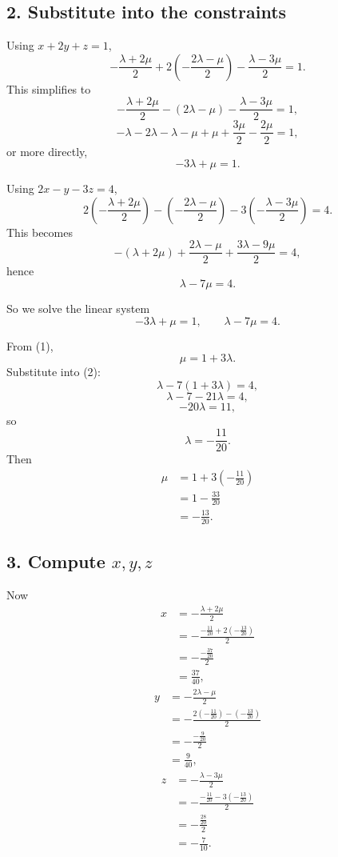 \subsection*{2. Substitute into the constraints}

Using \(x+2y+z=1\),
\[
-\frac{\lambda+2\mu}{2}
+2\left(-\frac{2\lambda-\mu}{2}\right)
-\frac{\lambda-3\mu}{2}
=1.
\]
This simplifies to
\[
-\frac{\lambda+2\mu}{2}-(2\lambda-\mu)-\frac{\lambda-3\mu}{2}=1,
\]
\[
-\lambda-2\lambda-\lambda-\mu+\mu+\frac{3\mu}{2}-\frac{2\mu}{2}=1,
\]
or more directly,
\[
-3\lambda+\mu=1. \tag{1}
\]

Using \(2x-y-3z=4\),
\[
2\left(-\frac{\lambda+2\mu}{2}\right)
-\left(-\frac{2\lambda-\mu}{2}\right)
-3\left(-\frac{\lambda-3\mu}{2}\right)
=4.
\]
This becomes
\[
-(\lambda+2\mu)+\frac{2\lambda-\mu}{2}+\frac{3\lambda-9\mu}{2}=4,
\]
hence
\[
\lambda-7\mu=4. \tag{2}
\]

So we solve the linear system
\[
-3\lambda+\mu=1,
\qquad
\lambda-7\mu=4.
\]

From (1),
\[
\mu=1+3\lambda.
\]
Substitute into (2):
\[
\lambda-7(1+3\lambda)=4,
\]
\[
\lambda-7-21\lambda=4,
\]
\[
-20\lambda=11,
\]
so
\[
\lambda=-\frac{11}{20}.
\]
Then
\[
\begin{aligned}
\mu
&=1+3\left(-\frac{11}{20}\right)\\
&=1-\frac{33}{20}\\
&=-\frac{13}{20}.
\end{aligned}
\]

\subsection*{3. Compute \(x,y,z\)}

Now
\[
\begin{aligned}
x
&=-\frac{\lambda+2\mu}{2}\\
&=
-\frac{-\frac{11}{20}+2\left(-\frac{13}{20}\right)}{2}\\
&=
-\frac{-\frac{37}{20}}{2}\\
&=
\frac{37}{40},
\end{aligned}
\]
\[
\begin{aligned}
y
&=-\frac{2\lambda-\mu}{2}\\
&=
-\frac{2\left(-\frac{11}{20}\right)-\left(-\frac{13}{20}\right)}{2}\\
&=
-\frac{-\frac{9}{20}}{2}\\
&=
\frac{9}{40},
\end{aligned}
\]
\[
\begin{aligned}
z
&=-\frac{\lambda-3\mu}{2}\\
&=
-\frac{-\frac{11}{20}-3\left(-\frac{13}{20}\right)}{2}\\
&=
-\frac{\frac{28}{20}}{2}\\
&=
-\frac{7}{10}.
\end{aligned}
\]

